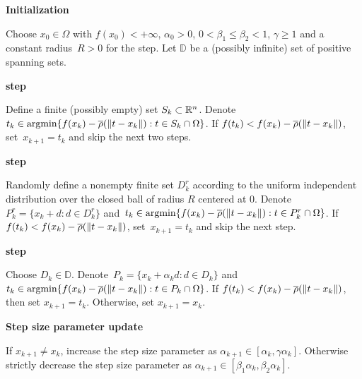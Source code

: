 \begin{algorithm}[h]
	\caption{Directional direct-search method (following~\cite[Algorithm~2.1]{ViCu2012}, except for the additional \textbf{\revpoll step})}
	\label{algo:new_mads}
	\begin{algorithmic}
		\State \textbf{Initialization} \vspace{0.1cm}
		\State \hfill \begin{minipage}{0.96\linewidth}
			Choose $x_0 \in \Omega$ with $f(x_0) < +\infty$, $\alpha_0 > 0$, $0 < \beta_1 \leq \beta_2 < 1$, $\gamma \geq 1$ and a constant radius~$R > 0$
			for the \revpoll step.
			Let $\mathbb{D}$ be a (possibly infinite) set of positive spanning sets.
		\end{minipage} \vspace{0.2cm}
		\State \textbf{\search step} \vspace{0.1cm}
		\State \hfill \begin{minipage}{0.92\linewidth}
			Define a finite (possibly empty) set $S_k \subset \mathbb{R}^n$.
			Denote~$t_k \in \operatorname*{argmin} \{f(x_k)-\overline{\rho}(\left\lVert t-x_k\right\rVert) : t \in S_k \cap \Omega\}$.
			If $f(t_k) < f(x_k)-\overline{\rho}(\left\lVert t-x_k\right\rVert)$, set~$x_{k+1} = t_k$ and skip the next two steps.
		\end{minipage} \vspace{0.2cm}
		\State \textbf{\revpoll step} \vspace{0.1cm}
		\State \hfill \begin{minipage}{0.92\linewidth}
			Randomly define a nonempty finite set $D_k^r$ according to the uniform independent distribution over the closed ball of radius $R$ centered at $0$.
			Denote~$P^r_k = \{x_k+d : d \in D^r_k\}$ and~$t_k \in \operatorname*{argmin} \{f(x_k)-\overline{\rho}(\left\lVert t-x_k\right\rVert) : t \in P^r_k \cap \Omega\}$.
			If $f(t_k) < f(x_k)-\overline{\rho}(\left\lVert t-x_k\right\rVert)$, set~$x_{k+1} = t_k$ and skip the next \poll step.
		\end{minipage} \vspace{0.2cm}
		\State \textbf{\poll step} \vspace{0.1cm}
		\State \hfill \begin{minipage}{0.92\linewidth}
			Choose $D_k \in \mathbb{D}$.
			Denote~$P_k = \{x_k+\alpha_kd : d \in D_k\}$ and~$t_k \in \operatorname*{argmin} \{f(x_k)-\overline{\rho}(\left\lVert t-x_k\right\rVert) : t \in P_k \cap \Omega\}$.
			If $f(t_k) < f(x_k)-\overline{\rho}(\left\lVert t-x_k\right\rVert)$, then set $x_{k+1} = t_k$.
			Otherwise, set $x_{k+1} = x_k$.
		\end{minipage} \vspace{0.2cm}
		\State \textbf{Step size parameter update} \vspace{0.1cm}
		\State \hfill \begin{minipage}{0.92\linewidth}
			If $x_{k+1} \neq x_k$, increase the step size parameter as $\alpha_{k+1} \in [\alpha_k,\gamma\alpha_k]$.
			Otherwise strictly decrease the step size parameter as $\alpha_{k+1} \in [\beta_1\alpha_k,\beta_2\alpha_k]$.
		\end{minipage}
		\EndFor
	\end{algorithmic}
\end{algorithm}

